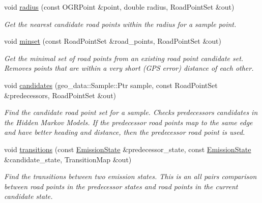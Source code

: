 \begin{DoxyCompactItemize}
void \hyperlink{classhmm__mm_1_1RoadMap_a17ae636d51887670e192fad2cb87ce4f}{radius} (const O\+G\+R\+Point \&point, double radius, Road\+Point\+Set \&out)
\begin{DoxyCompactList}\small\item\em Get the nearest candidate road points within the radius for a sample point. \end{DoxyCompactList}\item 
void \hyperlink{classhmm__mm_1_1RoadMap_a31ca066cdbd48471441baef3c118f2cd}{minset} (const Road\+Point\+Set \&road\+\_\+points, Road\+Point\+Set \&out)
\begin{DoxyCompactList}\small\item\em Get the minimal set of road points from an existing road point candidate set. Removes points that are within a very short (G\+PS error) distance of each other. \end{DoxyCompactList}\item 
void \hyperlink{classhmm__mm_1_1RoadMap_a6c594cef8fe885644c028ab1647740c5}{candidates} (geo\+\_\+data\+::\+Sample\+::\+Ptr sample, const Road\+Point\+Set \&predecessors, Road\+Point\+Set \&out)
\begin{DoxyCompactList}\small\item\em Find the candidate road point set for a sample. Checks predecessor\textquotesingle{}s candidates in the Hidden Markov Models. If the predecessor road points map to the same edge and have better heading and distance, then the predecessor road point is used. \end{DoxyCompactList}\item 
void \hyperlink{classhmm__mm_1_1RoadMap_a1985f0104837c0674dfc1e4302cee862}{transitions} (const \hyperlink{classhmm__mm_1_1EmissionState}{Emission\+State} \&predecessor\+\_\+state, const \hyperlink{classhmm__mm_1_1EmissionState}{Emission\+State} \&candidate\+\_\+state, Transition\+Map \&out)
\begin{DoxyCompactList}\small\item\em Find the transitions between two emission states. This is an all pairs comparison between road points in the predecessor states and road points in the current candidate state. \end{DoxyCompactList}\end{DoxyCompactItemize}
